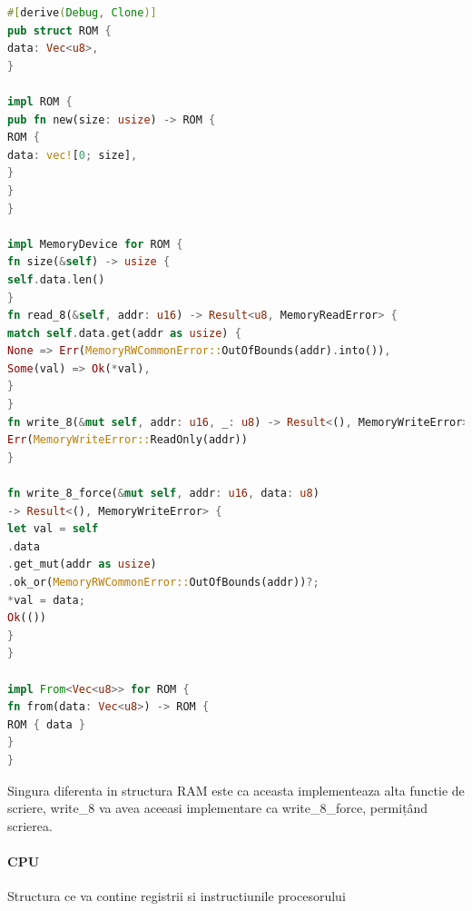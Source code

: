 \documentclass[titlepage,12pt]{article}
\DeclareRobustCommand{\code}[1]{{\ttfamily\small #1}}
\begin{document}
\begin{lstlisting}[language=Rust,caption={Structura ROM},label={lst:rom-struct}]
#[derive(Debug, Clone)]
pub struct ROM {
data: Vec<u8>,
}

impl ROM {
pub fn new(size: usize) -> ROM {
ROM {
data: vec![0; size],
}
}
}

impl MemoryDevice for ROM {
fn size(&self) -> usize {
self.data.len()
}
fn read_8(&self, addr: u16) -> Result<u8, MemoryReadError> {
match self.data.get(addr as usize) {
None => Err(MemoryRWCommonError::OutOfBounds(addr).into()),
Some(val) => Ok(*val),
}
}
fn write_8(&mut self, addr: u16, _: u8) -> Result<(), MemoryWriteError> {
Err(MemoryWriteError::ReadOnly(addr))
}

fn write_8_force(&mut self, addr: u16, data: u8)
-> Result<(), MemoryWriteError> {
let val = self
.data
.get_mut(addr as usize)
.ok_or(MemoryRWCommonError::OutOfBounds(addr))?;
*val = data;
Ok(())
}
}

impl From<Vec<u8>> for ROM {
fn from(data: Vec<u8>) -> ROM {
ROM { data }
}
}
\end{lstlisting}

Singura diferenta in structura \code{RAM} este ca aceasta implementeaza alta functie de scriere, \code{write\_8} va avea aceeasi implementare ca \code{write\_8\_force}, permițând scrierea.

\paragraph{\code{CPU}} Structura ce va contine registrii si instructiunile procesorului
\end{document}
